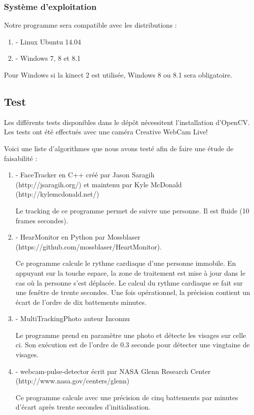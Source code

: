 \documentclass[12pt,a4paper]{article}
\begin{document}
\subsubsection{Système d'exploitation}

Notre programme sera compatible avec les distributions : 
\begin{enumerate}
\item[] - Linux Ubuntu 14.04
\item[] - Windows 7, 8 et 8.1
\end{enumerate}
Pour Windows si la kinect 2 est utilisée, Windows 8 ou 8.1 sera obligatoire.

\subsection{Test}
Les différents tests disponibles dans le dépôt nécessitent l'installation d'OpenCV.
Les tests ont été effectués avec une caméra Creative WebCam Live!

Voici une liste d'algorithmes que nous avons testé afin de faire une étude de faisabilité : 

\begin{enumerate}

\item[] - FaceTracker en C++ 
créé par Jason Saragih \\(http://jsaragih.org/) et maintenu par Kyle McDonald\\ (http://kylemcdonald.net/)

Le tracking de ce programme permet de suivre une personne. Il est fluide (10 frames secondes).
\newline
\item[] - HearMonitor en Python par Mossblaser \\(https://github.com/mossblaser/HeartMonitor).


Ce programme calcule le rythme cardiaque d'une personne immobile. En appuyant sur la touche espace, la zone de traitement est mise à jour dans le cas où la personne s'est déplacée. Le calcul du rythme cardiaque se fait sur une fenêtre de trente secondes. 
Une fois opérationnel, la précision contient un écart de l'ordre de dix battements minutes.

\item[] - MultiTrackingPhoto auteur Inconnu 

Le programme prend en paramètre une photo et détecte les visages sur celle ci.
Son exécution est de l'ordre de 0.3 seconde pour détecter une vingtaine de visages.
\newline
 \item[] - webcam-pulse-detector écrit par NASA Glenn Research Center \\(http://www.nasa.gov/centers/glenn)

Ce programme calcule avec une précision de cinq battements par minutes d'écart après trente secondes d'initialisation.

\end{enumerate}
\end{document}
